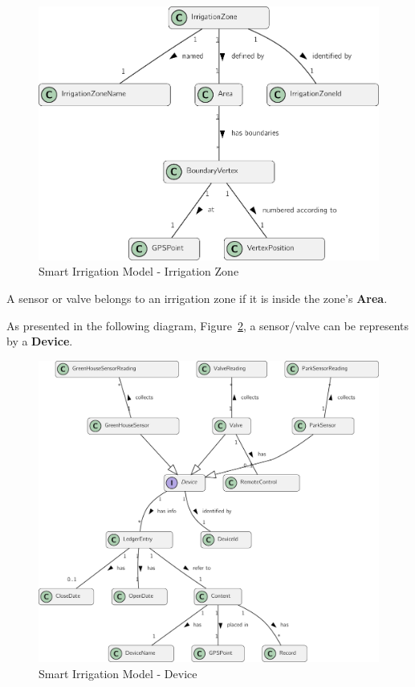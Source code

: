 \begin{figure}[H]
   \centering
   \includegraphics[page=1,width=0.7\columnwidth]{assets/diagrams/design/domain/smart-irrigation-model-2.pdf}
  \caption[Smart Irrigation Model - Irrigation Zone]{Smart Irrigation Model - Irrigation Zone}
  \label{fig:design:domain:bounded_contexts:irrigation:diagram:garden}
\end{figure}

A sensor or valve belongs to an irrigation zone if it is inside the zone's \textbf{Area}.

As presented in the following diagram, Figure~\ref{fig:design:domain:bounded_contexts:irrigation:diagram:device}, a sensor/valve can be represents by a \textbf{Device}.

\begin{figure}[H]
   \centering
  \includegraphics[page=1,width=\columnwidth]{assets/diagrams/design/domain/smart-irrigation-model-3.pdf}
  \caption[Smart Irrigation Model - Device]{Smart Irrigation Model - Device}
  \label{fig:design:domain:bounded_contexts:irrigation:diagram:device}
\end{figure}

